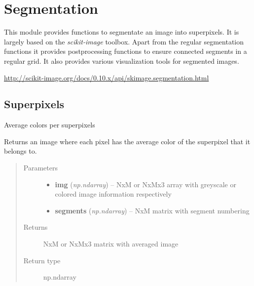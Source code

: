 \documentclass[letterpaper,10pt,english]{sphinxmanual}
\begin{document}
\section{Segmentation}
\label{flamingo/segmentation/index:segmentation}\label{flamingo/segmentation/index::doc}
This module provides functions to segmentate an image into
superpixels. It is largely based on the \emph{scikit-image} toolbox.
Apart from the regular segmentation functions it provides
postprocessing functions to ensure connected segments in a regular
grid. It also provides various visualization tools for segmented
images.




\href{http://scikit-image.org/docs/0.10.x/api/skimage.segmentation.html}{http://scikit-image.org/docs/0.10.x/api/skimage.segmentation.html}




\subsection{Superpixels}
\label{flamingo/segmentation/index:superpixels}\label{flamingo/segmentation/index:module-flamingo.segmentation.superpixels}

\begin{fulllineitems}
\label{flamingo/segmentation/index:flamingo.segmentation.superpixels.average_colors}
Average colors per superpixels

Returns an image where each pixel has the average color of the
superpixel that it belongs to.
\begin{quote}\begin{description}
\item[{Parameters}] \leavevmode\begin{itemize}
\item {} 
\textbf{img} (\emph{np.ndarray}) -- NxM or NxMx3 array with greyscale or colored image information
respectively

\item {} 
\textbf{segments} (\emph{np.ndarray}) -- NxM matrix with segment numbering

\end{itemize}

\item[{Returns}] \leavevmode
NxM or NxMx3 matrix with averaged image

\item[{Return type}] \leavevmode
np.ndarray

\end{description}\end{quote}

\end{fulllineitems}
\end{document}
